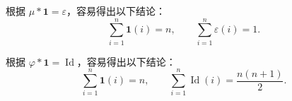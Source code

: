 
根据 $\mu * \mathbf{1} = \varepsilon$，容易得出以下结论：
\[
\sum_{i = 1}^{n} \mathbf{1}(i) = n,\qquad 
\sum_{i = 1}^{n} \varepsilon(i) = 1.
\]


根据 $\varphi * \mathbf{1} = \operatorname{Id}$，容易得出以下结论：
\[
\sum_{i = 1}^{n} \mathbf{1}(i) = n,\qquad 
\sum_{i = 1}^{n} \operatorname{Id}(i) = \frac{n(n+1)}{2}.
\] 
